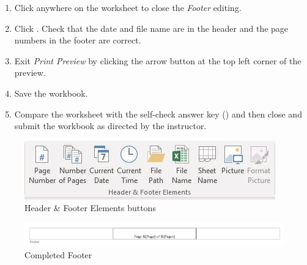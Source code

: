 \begin{enumbox}
\begin{enumerate}
		\item Click anywhere on the worksheet to close the \textit{Footer} editing.
		\item Click . Check that the date and file name are in the header and the page numbers in the footer are correct.
		\item Exit \textit{Print Preview} by clicking the arrow button at the top left corner of the preview.
		\item Save the  workbook.
		\item Compare the worksheet with the self-check answer key () and then close and submit the  workbook as directed by the instructor.
	\end{enumerate}
\end{enumbox}
	
\begin{figure}[H]
	\centering
	\includegraphics[width=\maxwidth{.95\linewidth}]{gfx/ch03_fig32}
	\caption{Header \& Footer Elements buttons}
	\label{03:fig32}
\end{figure}

\begin{figure}[H]
	\centering
	\includegraphics[width=\maxwidth{.95\linewidth}]{gfx/ch03_fig33}
	\caption{Completed Footer}
	\label{03:fig33}
\end{figure}

